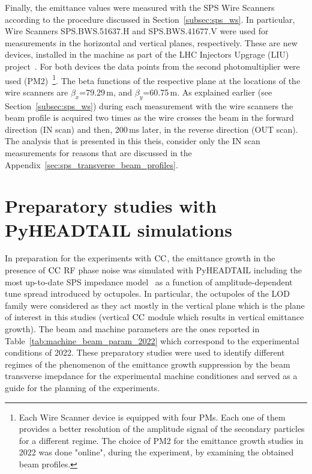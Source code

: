 Finally, the emittance values were measured with the SPS Wire Scanners according to the procedure discussed in Section~\ref{subsec:sps_ws}. In particular, Wire Scanners SPS.BWS.51637.H and SPS.BWS.41677.V were used for measurements in the horizontal and vertical planes, respectively. These are new devices, installed in the machine as part of the LHC Injectors Upgrage (LIU) project~\cite{Shaposhnikova:2016cix}. For both devices the data points from the second photomultiplier were used (PM2)~\footnote{Each Wire Scanner device is equipped with four PMs. Each one of them provides a better resolution of the amplitude signal of the secondary particles for a different regime. The choice of PM2 for the emittance growth studies in 2022 was done "online", during the experiment, by examining the obtained beam profiles.}. The beta functions of the respective plane at the locations of the wire scanners are $\beta_x$=79.29\,m, and $\beta_y$=60.75\,m. 
As explained earlier (see Section~\ref{subsec:sps_ws}) during each measurement with the wire scanners the beam profile is acquired two times as the wire crosses the beam in the forward direction (IN scan) and then, 200\,ms later, in the reverse direction (OUT scan). The analysis that is presented in this theis, consider only the IN scan measurements for reasons that are discussed in the Appendix~\ref{sec:sps_transverse_beam_profiles}.



\section{Preparatory studies with PyHEADTAIL simulations}\label{sec:preparatory_studies_2022_cc}

In preparation for the experiments with ${\mathrm{CC}}$, the emittance growth in the presence of ${\mathrm{CC}}$ RF phase noise was simulated with PyHEADTAIL including the most up-to-date SPS impedance model~\cite{updated_sps_wakfields_model} as a function of amplitude-dependent tune spread introduced by octupoles. In particular, the octupoles of the LOD family were considered as they act mostly in the vertical plane which is the plane of interest in this studies (vertical ${\mathrm{CC}}$ module which results in vertical emittance growth). The beam and machine parameters are the ones reported in Table~\ref{tab:machine_beam_param_2022} which correspond to the experimental conditions of 2022. These preparatory studies were used to identify different regimes of the phenomenon of the emittance growth suppression by the beam transverse imepdance for the experimental machine conditiones and served as a guide for the planning of the experiments.

